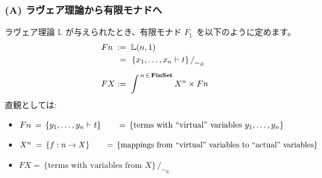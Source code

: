 \documentclass[
		head_space=20mm,
		foot_space=20mm,
		gutter=10mm,
		line_length=190mm
]{jlreq}
\begin{document}
\clearpage

\subsubsection*{(A) ラヴェア理論から有限モナドへ}

\noindent ラヴェア理論 $\mathbb L$ が与えられたとき、有限モナド $F_{\mathbb L}$ を以下のように定めます。
\begin{align*}
	Fn \;&:=\; \mathbb L(n,1)\\
	&\;=\; \left.\{x_1,\dots,x_n\vdash t\}\,\right/_{{\sim}_E}\\[5pt]
	FX&:=\;\int^{\,n\,\in\,\mathbf{FinSet}}X^n\times Fn
\end{align*}
直観としては: 
\begin{itemize}
	\item $Fn\hspace*{2pt}=\,\{y_1,\dots,y_n\vdash t\}\\ \hspace*{17pt}\hspace*{2pt} =\, \{\textrm{terms with ``virtual'' variables $y_1,\dots, y_n$}\}$
	\item $X^n\hspace*{3pt}=\,\{f:n\to X\}\\\hspace*{16pt}\hspace*{3pt}=\, \{\textrm{mappings from ``virtual'' variables to ``actual'' variables}\}$
	\item $FX=\,\{\textrm{terms with variables from $X$}\}\,/_{{\sim}_E}$

\end{itemize}
\end{document}
